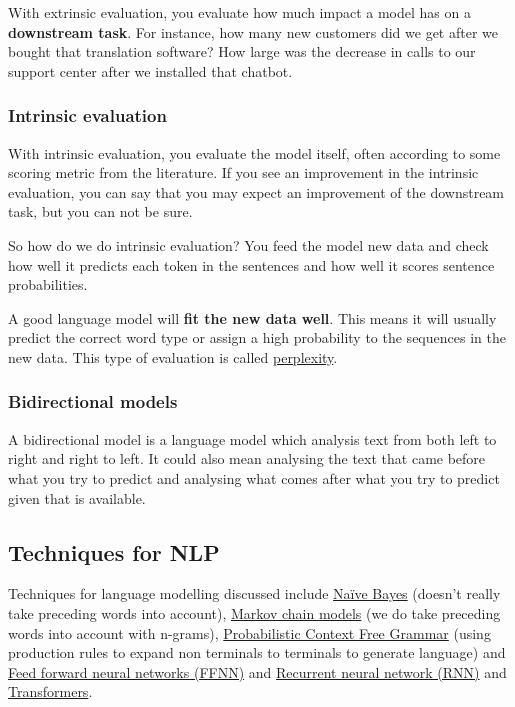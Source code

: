 \documentclass[
  11pt,
  british,
]{article}
\begin{document}
With extrinsic evaluation, you evaluate how much impact a model has on a
\textbf{downstream task}. For instance, how many new customers did we
get after we bought that translation software? How large was the
decrease in calls to our support center after we installed that chatbot.

\hypertarget{intrinsic-evaluation-1}{%
\subsubsection{Intrinsic evaluation}\label{intrinsic-evaluation-1}}

With intrinsic evaluation, you evaluate the model itself, often
according to some scoring metric from the literature. If you see an
improvement in the intrinsic evaluation, you can say that you may expect
an improvement of the downstream task, but you can not be sure.

So how do we do intrinsic evaluation? You feed the model new data and
check how well it predicts each token in the sentences and how well it
scores sentence probabilities.

A good language model will \textbf{fit the new data well}. This means it
will usually predict the correct word type or assign a high probability
to the sequences in the new data. This type of evaluation is called
\href{Perplexity.md}{perplexity}.

\hypertarget{bidirectional-models}{%
\subsubsection{Bidirectional models}\label{bidirectional-models}}

A bidirectional model is a language model which analysis text from both
left to right and right to left. It could also mean analysing the text
that came before what you try to predict and analysing what comes after
what you try to predict given that is available.

\hypertarget{techniques-for-nlp}{%
\subsection{Techniques for NLP}\label{techniques-for-nlp}}

Techniques for language modelling discussed include
\href{../Classification/Native\%20baiyes/Naïve\%20Bayes\%20Classifier.md}{Naïve
Bayes} (doesn't really take preceding words into account),
\href{Markov\%20models.md}{Markov chain models} (we do take preceding
words into account with n-grams),
\href{../Languages/Probabilistic\%20Context\%20Free\%20Grammar.md}{Probabilistic
Context Free Grammar} (using production rules to expand non terminals to
terminals to generate language) and
\href{Feed\%20forward\%20neural\%20networks\%20(FFNN).md}{Feed forward
neural networks (FFNN)} and
\href{Recurrent\%20neural\%20network\%20(RNN).md}{Recurrent neural
network (RNN)} and \href{Transformers.md}{Transformers}.
\end{document}

